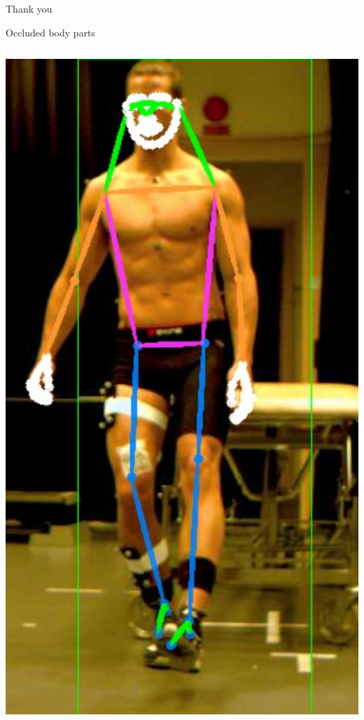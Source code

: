 \begin{frame}[standout]
  Thank you
\end{frame}

\appendix

\begin{frame}[fragile]{Occluded body parts}
  \begin{columns}[T,onlytextwidth]
      \includegraphics[height=0.74\textheight]{files/figs/res/hpe/36-5.png}

\end{columns}
\end{frame}
